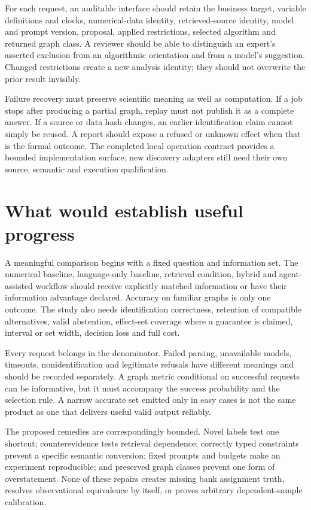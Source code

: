 For each request, an auditable interface should retain the business target,
variable definitions and clocks, numerical-data identity, retrieved-source
identity, model and prompt version, proposal, applied restrictions, selected
algorithm and returned graph class. A reviewer should be able to distinguish
an expert's asserted exclusion from an algorithmic orientation and from a
model's suggestion. Changed restrictions create a new analysis identity;
they should not overwrite the prior result invisibly.

Failure recovery must preserve scientific meaning as well as computation. If a
job stops after producing a partial graph, replay must not publish it as a
complete answer. If a source or data hash changes, an earlier identification
claim cannot simply be reused. A report should expose a refused or unknown
effect when that is the formal outcome. The completed local operation contract
provides a bounded implementation surface; new discovery adapters still need
their own source, semantic and execution qualification.

\section{What would establish useful progress}

A meaningful comparison begins with a fixed question and information set.
The numerical baseline, language-only baseline, retrieval condition, hybrid
and agent-assisted workflow should receive explicitly matched information or
have their information advantage declared. Accuracy on familiar graphs is
only one outcome. The study also needs identification correctness, retention
of compatible alternatives, valid abstention, effect-set coverage where a
guarantee is claimed, interval or set width, decision loss and full cost.

Every request belongs in the denominator. Failed parsing, unavailable models,
timeouts, nonidentification and legitimate refusals have different meanings
and should be recorded separately. A graph metric conditional on successful
requests can be informative, but it must accompany the success probability
and the selection rule. A narrow accurate set emitted only in easy cases is
not the same product as one that delivers useful valid output reliably.

The proposed remedies are correspondingly bounded. Novel labels test one
shortcut; counterevidence tests retrieval dependence; correctly typed
constraints prevent a specific semantic conversion; fixed prompts and budgets
make an experiment reproducible; and preserved graph classes prevent one form
of overstatement. None of these repairs creates missing bank assignment
truth, resolves observational equivalence by itself, or proves arbitrary
dependent-sample calibration.

